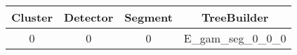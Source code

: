 \begin{tabular}{cccc}
\hline
Cluster & Detector & Segment & TreeBuilder            \\
\hline
0       & 0        & 0       & E\_gam\_seg\_0\_0\_0   \\
\hline
\end{tabular}